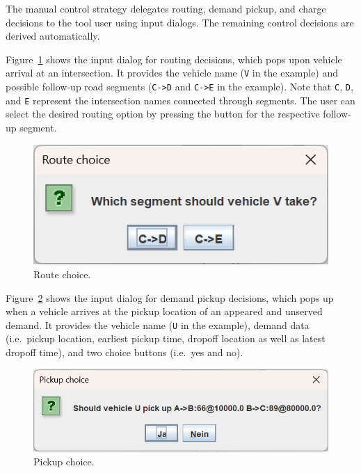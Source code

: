 \documentclass[a4paper,twoside]{article}
\begin{document}
	The manual control strategy delegates routing, demand pickup, and charge decisions to the tool user using input dialogs.
	The remaining control decisions are derived automatically.
	
	Figure~\ref{fig:manual-controller-route} shows the input dialog for routing decisions, which pops upon vehicle arrival at an intersection.
	It provides the vehicle name (\texttt{V} in the example) and possible follow-up road segments (\texttt{C->D} and \texttt{C->E} in the example).
	Note that \texttt{C}, \texttt{D}, and \texttt{E} represent the intersection names connected through segments.
	The user can select the desired routing option by pressing the button for the respective follow-up segment.
	
	\begin{figure}[!ht]
		\centering
		\includegraphics[scale=0.3]{../../screenshots/manual-controller-route.png}
		\caption{Route choice.}
		\label{fig:manual-controller-route}
	\end{figure}
	
	Figure~\ref{fig:manual-controller-demand} shows the input dialog for demand pickup decisions, which pops up when a vehicle arrives at the pickup location of an appeared and unserved demand. It provides the vehicle name (\texttt{U} in the example), demand data (i.e.\ pickup location, earliest pickup time, dropoff location as well as latest dropoff time), and two choice buttons (i.e.\ yes and no).
	
	\begin{figure}[!ht]
		\centering
		\includegraphics[scale=0.3]{../../screenshots/manual-controller-demand.png}
		\caption{Pickup choice.}
		\label{fig:manual-controller-demand}
	\end{figure}
	
\end{document}
